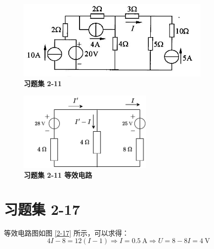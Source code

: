 \documentclass[UTF8]{report}
\theoremstyle{MyLineTheoremStyle} %
\theoremstyle{MyBlockTheoremStyle} %
\theoremstyle{MySubsubsectionStyle} %
\begin{document}
\noindent\begin{minipage}{0.55\textwidth}
\begin{figure}[H]\centering
\includegraphics[height=110pt]{assets/2/1187c3e12fa1e6bd8d2019d53bd2752a.jpg}
\caption{\textbf{习题集 2-11}}
\end{figure}
\end{minipage}\hfill
\begin{minipage}{0.43\textwidth}
\begin{figure}[H]\centering
\includegraphics[height=110pt]{assets/2/2-11.drawio.pdf}
\caption{\textbf{习题集 2-11 等效电路}}\label{习题集 2-11 等效电路}
\end{figure}
\end{minipage}

\section{习题集 2-17}

等效电路图如图 \ref{2-17} 所示，可以求得：
\begin{equation*}
4I - 8 = 12(I-1) \Longrightarrow I = 0.5\ \mathrm{A}\Longrightarrow U = 8 - 8I = 4\ \mathrm{V}
\end{equation*}
\end{document}
